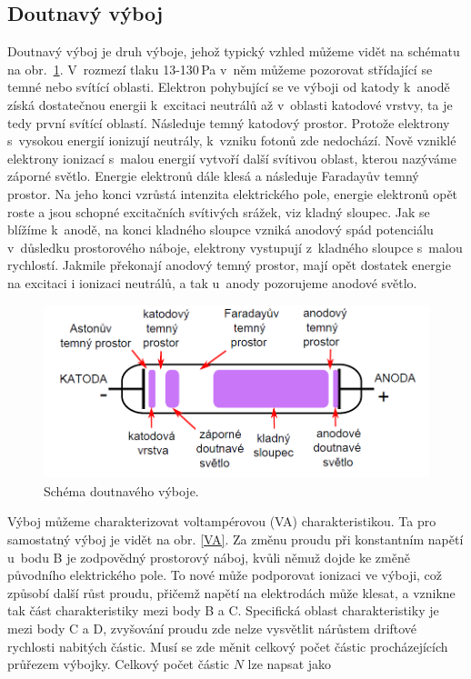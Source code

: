\documentclass[a4paper,12pt]{article}
\begin{document}
\subsection{Doutnavý výboj}
Doutnavý výboj je druh výboje, jehož typický vzhled můžeme vidět na schématu na 
obr.~\ref{glowdischarge}. V~rozmezí tlaku 13-130\,\si{\pascal} v~něm můžeme 
pozorovat střídající se temné nebo svítící oblasti. Elektron pohybující se ve 
výboji od katody k~anodě získá dostatečnou energii k~excitaci neutrálů až 
v~oblasti katodové vrstvy, ta je tedy první svítící oblastí. Následuje temný 
katodový prostor. Protože elektrony s~vysokou energií ionizují neutrály, 
k~vzniku fotonů zde nedochází. Nově vzniklé elektrony ionizací s~malou energií 
vytvoří další svítivou oblast, kterou nazýváme záporné světlo. Energie 
elektronů dále klesá a následuje Faradayův temný prostor. Na jeho konci vzrůstá 
intenzita elektrického pole, energie elektronů opět roste a jsou schopné 
excitačních svítivých srážek, viz kladný sloupec. Jak se blížíme k~anodě, na 
konci kladného sloupce vzniká anodový spád potenciálu v~důsledku prostorového 
náboje, elektrony vystupují z~kladného sloupce s~malou rychlostí. Jakmile 
překonají anodový temný prostor, mají opět dostatek energie na excitaci i 
ionizaci neutrálů, a tak u~anody pozorujeme anodové světlo.

\begin{figure}[h]
	\centering
	\includegraphics[width=130mm]{glowdischarge.png}
	\caption{Schéma doutnavého výboje.}
	\label{glowdischarge}
\end{figure}

Výboj můžeme charakterizovat voltampérovou (VA) charakteristikou. Ta pro 
samostatný výboj je vidět na obr. \ref{VA}. Za změnu proudu při konstantním 
napětí u~bodu B je zodpovědný prostorový náboj, kvůli němuž dojde ke změně 
původního elektrického pole. To nové může podporovat ionizaci ve výboji, což 
způsobí další růst proudu, přičemž napětí na elektrodách může klesat, a vznikne 
tak část charakteristiky mezi body B a C. Specifická oblast charakteristiky je 
mezi body C a D, zvyšování proudu zde nelze vysvětlit nárůstem driftové 
rychlosti nabitých částic. Musí se zde měnit celkový počet částic 
procházejících průřezem výbojky. Celkový počet částic $N$ lze napsat jako
\end{document}
